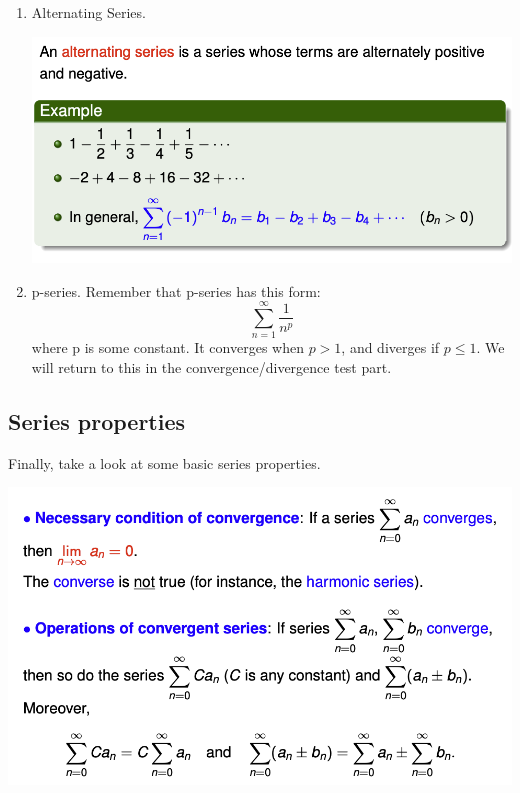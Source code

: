 \documentclass{article}
\begin{document}
\begin{enumerate}
    \item Alternating Series. 
     \begin{center}
        \includegraphics[scale = 0.7]{Screenshot 2023-12-07 at 12.51.51 PM.png}
    \end{center}  

    \item p-series.
    Remember that p-series has this form: 
    $$ \sum_{n=1}^{\infty} \frac{1}{n^{p}}$$
    where p is some constant. It converges when $p > 1$, and diverges if $p \le 1$. We will return to this in the convergence/divergence test part. 
\end{enumerate}

\subsection{Series properties}
Finally, take a look at some basic series properties. 
 \begin{center}
        \includegraphics[scale = 0.7]{properties series.png}
    \end{center} 

%
%
%
%
\end{document}
